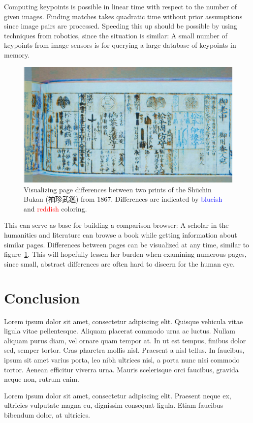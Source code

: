 \documentclass{ltjarticle}
\begin{document}
Computing keypoints is possible in linear time with respect to the number of given images. Finding matches takes quadratic time without prior assumptions since image pairs are processed. Speeding this up should be possible by using techniques from robotics, since the situation is similar: A small number of keypoints from image sensors is for querying a large database of keypoints in memory.

\begin{figure}
    \centering
    \includegraphics[width=\textwidth]{200019646_00006}
    \caption[Visualizing page differences]{Visualizing page differences between two prints of the Shūchin Bukan (袖珍武鑑) from 1867. Differences are indicated by \textcolor{blue}{blueish} and \textcolor{red}{reddish} coloring.}
    \label{fig:page-compare}
\end{figure}

This can serve as base for building a comparison browser: A scholar in the humanities and literature can browse a book while getting information about similar pages. Differences between pages can be visualized at any time, similar to figure~\ref{fig:page-compare}. This will hopefully lessen her burden when examining numerous pages, since small, abstract differences are often hard to discern for the human eye. 

\section{Conclusion}

Lorem ipsum dolor sit amet, consectetur adipiscing elit. Quisque vehicula vitae ligula vitae pellentesque. Aliquam placerat commodo urna ac luctus. Nullam aliquam purus diam, vel ornare quam tempor at. In ut est tempus, finibus dolor sed, semper tortor. Cras pharetra mollis nisl. Praesent a nisl tellus. In faucibus, ipsum sit amet varius porta, leo nibh ultrices nisl, a porta nunc nisi commodo tortor. Aenean efficitur viverra urna. Mauris scelerisque orci faucibus, gravida neque non, rutrum enim.

Lorem ipsum dolor sit amet, consectetur adipiscing elit. Praesent neque ex, ultricies vulputate magna eu, dignissim consequat ligula. Etiam faucibus bibendum dolor, at ultricies. 

\printbibliography
\end{document}
